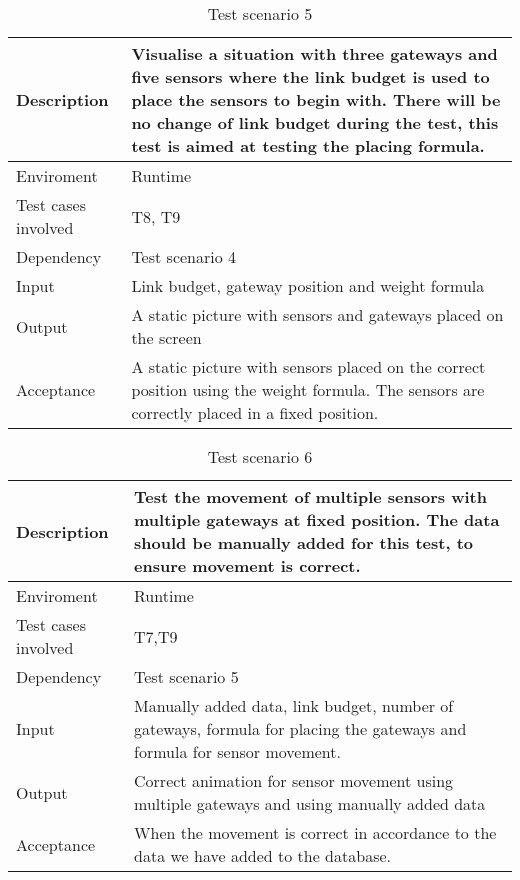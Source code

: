 \documentclass[../document]{subfiles}
\begin{document}
\begin{table}[H]
\caption{Test scenario 5}
\centering
\begin{tabularx}{\textwidth}{|L{3cm}|X|}
	\hline
	Description
	&Visualise a situation with three gateways and five sensors where the link budget is used to place the sensors to begin with. There will be no change of link budget during the test, this test is aimed at testing the placing formula.
	\\ \hline Enviroment
	&Runtime
	\\ \hline Test cases involved
	&T8, T9
	\\ \hline Dependency
	&Test scenario 4
	\\ \hline Input
	&Link budget, gateway position and weight formula
	\\ \hline Output
	&A static picture with sensors and gateways placed on the screen
	\\ \hline Acceptance
	&A static picture with sensors placed on the correct position using the weight formula. The sensors are correctly placed in a fixed position.
	\\ \hline 
\end{tabularx}
\end{table}

\begin{table}[H]
\caption{Test scenario 6}
\centering
\begin{tabularx}{\textwidth}{|L{3cm}|X|}
	\hline
	Description
	&Test the movement of multiple sensors with multiple gateways at fixed position. The data should be manually added for this test, to ensure movement is correct.
	\\ \hline Enviroment
	&Runtime
	\\ \hline Test cases involved
	&T7,T9
	\\ \hline Dependency
	&Test scenario 5
	\\ \hline Input
	&Manually added data, link budget, number of gateways, formula for placing the gateways and formula for sensor movement. 
	\\ \hline Output
	&Correct animation for sensor movement using multiple gateways and using manually added data
	\\ \hline Acceptance
	&When the movement is correct in accordance to the data we have added to the database.
	\\ \hline 
\end{tabularx}
\end{table}
\end{document}
